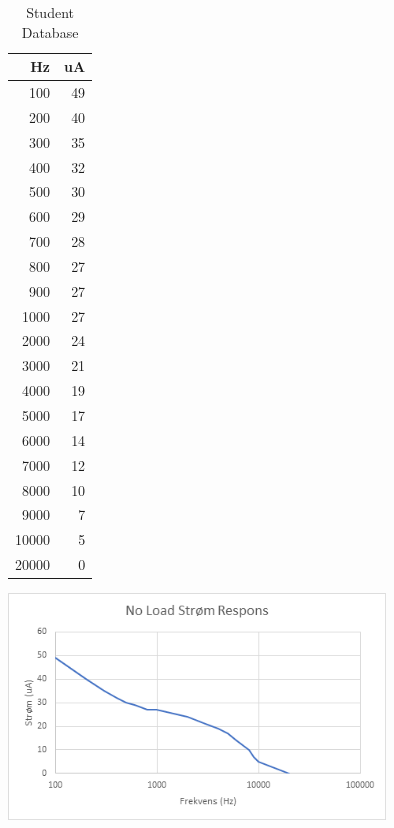 \documentclass[main.tex]{subfiles}
\begin{document}
\begin{table}[ht]
\begin{minipage}[b]{0.30\linewidth}
\centering
\begin{tabular}{ r |  r }
    \hline
    Hz & uA \\ \hline
    100 & 49 \\ \hline
    200 & 40 \\ \hline
    300 & 35 \\ \hline
    400 & 32 \\ \hline
    500 & 30 \\ \hline
    600 & 29 \\ \hline
    700 & 28 \\ \hline
    800 & 27 \\ \hline
    900 & 27 \\ \hline
    1000 & 27 \\ \hline
    2000 & 24 \\ \hline
    3000 & 21 \\ \hline
    4000 & 19 \\ \hline
    5000 & 17 \\ \hline
    6000 & 14 \\ \hline
    7000 & 12 \\ \hline
    8000 & 10 \\ \hline
    9000 & 7 \\ \hline
    10000 & 5 \\ \hline
    20000 & 0 \\ \hline
\end{tabular}
    \caption{Student Database}
    \label{table:student}
\end{minipage}\hfill
\begin{minipage}[b]{0.7\linewidth}
\centering
\includegraphics[width=10cm]{Figure/stromfrekvensoprindelig}
\label{fig:image}
\end{minipage}
\end{table}
\end{document}

